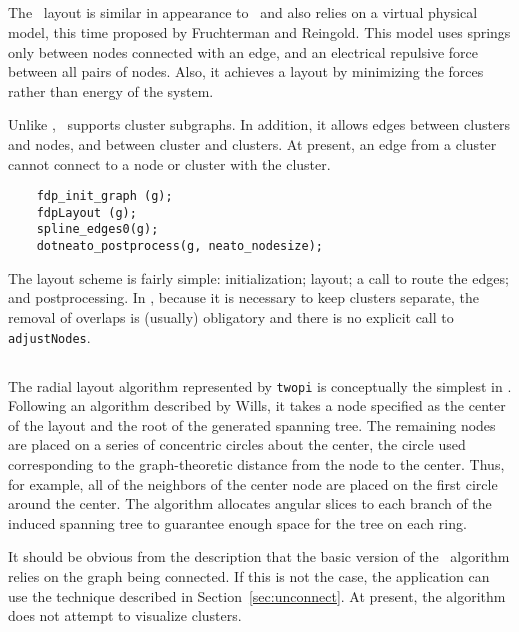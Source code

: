 \subsection{\fdp}
\label{sec:fdp}

The \fdp\ layout is similar in appearance to \neato\ and also relies
on a virtual physical model, this time proposed by Fruchterman and
Reingold\cite{fr}. This model uses springs only between nodes
connected with an edge, and an electrical repulsive force between
all pairs of nodes. Also, it achieves a layout by minimizing the forces
rather than energy of the system.

Unlike \neato, \fdp\ supports cluster subgraphs. In addition, it
allows edges between clusters and nodes, and between cluster and clusters.
At present, an edge from a cluster cannot connect to a node or cluster
with the cluster.

\begin{verbatim}
    fdp_init_graph (g);
    fdpLayout (g);
    spline_edges0(g);
    dotneato_postprocess(g, neato_nodesize);
\end{verbatim}

The layout scheme is fairly simple: initialization; layout; a call to
route the edges; and postprocessing. In \fdp, because it is necessary
to keep clusters separate, the removal of overlaps is (usually)
obligatory and there is no explicit call to {\tt adjustNodes}.

\subsection{\twopi}
\label{sec:twopi}

The radial layout algorithm represented by {\tt twopi} is conceptually the 
simplest in \gviz. Following an algorithm described by Wills\cite{nicheworks},
it takes a node specified as the center of the layout and the root
of the generated spanning tree. The remaining
nodes are placed on a series of concentric circles about the center,
the circle used corresponding to the graph-theoretic distance from the
node to the center. Thus, for example, all of the neighbors of the
center node are placed on the first circle around the center.
The algorithm allocates angular slices to each branch of the 
induced spanning tree to guarantee enough space for the tree on each ring.

It should be obvious from the description that the basic version of
the \twopi\ algorithm relies on the graph being connected. If this
is not the case, the application can use the technique described
in Section~\ref{sec:unconnect}.
At present, the algorithm does not attempt to visualize clusters.

